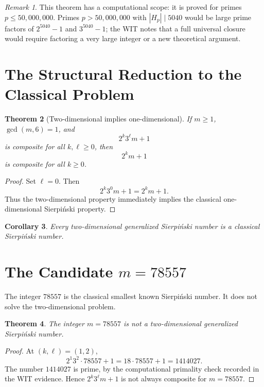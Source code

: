 \documentclass[11pt]{article}
\newtheorem{theorem}{Theorem}[section]
\newtheorem{corollary}[theorem]{Corollary}
\theoremstyle{definition}
\theoremstyle{remark}
\newtheorem{remark}[theorem]{Remark}
\begin{document}
\begin{remark}
This theorem has a computational scope: it is proved for primes
\(p\leq 50{,}000{,}000\).  Primes \(p>50{,}000{,}000\) with
\(|H_p|\mid 5040\) would be large prime factors of \(2^{5040}-1\) and
\(3^{5040}-1\); the WIT notes that a full universal closure would require
factoring a very large integer or a new theoretical argument.
\end{remark}

\section{The Structural Reduction to the Classical Problem}

\begin{theorem}[Two-dimensional implies one-dimensional]
If \(m\geq 1\), \(\gcd(m,6)=1\), and
\[
        2^k3^\ell m+1
\]
is composite for all \(k,\ell\geq 0\), then
\[
        2^k m+1
\]
is composite for all \(k\geq 0\).
\end{theorem}

\begin{proof}
Set \(\ell=0\).  Then
\[
        2^k3^0m+1=2^km+1.
\]
Thus the two-dimensional property immediately implies the classical
one-dimensional Sierpi\'nski property.
\end{proof}

\begin{corollary}
Every two-dimensional generalized Sierpi\'nski number is a classical
Sierpi\'nski number.
\end{corollary}

\section{The Candidate \(m=78557\)}

The integer \(78557\) is the classical smallest known Sierpi\'nski number.  It
does not solve the two-dimensional problem.

\begin{theorem}
The integer \(m=78557\) is not a two-dimensional generalized Sierpi\'nski
number.
\end{theorem}

\begin{proof}
At \((k,\ell)=(1,2)\),
\[
        2^1 3^2\cdot 78557+1
        =
        18\cdot 78557+1
        =
        1414027.
\]
The number \(1414027\) is prime, by the computational primality check recorded
in the WIT evidence.  Hence \(2^k3^\ell m+1\) is not always composite for
\(m=78557\).
\end{proof}
\end{document}
